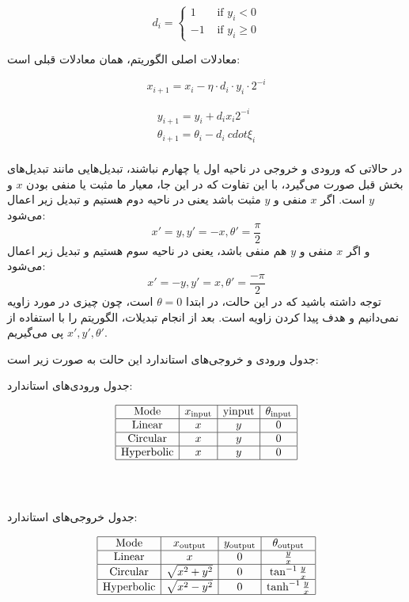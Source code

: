 \documentclass[12pt,titlepage,a4page , tikz , multi,table , svgnames,xcdraw]{article}
\begin{document}
$$d_{i}=\left\{\begin{array}{ll}
1 & \text { if } y_{i}<0 \\
-1 & \text { if } y_{i} \geq 0
\end{array}\right.$$

\newpage
معادلات اصلی الگوریتم، همان معادلات قبلی است:

$$x_{i+1}=x_{i}- \eta \cdot d_{i} \cdot y_{i} \cdot 2^{-i}$$

$$\begin{array}{c}
y_{i+1}=y_{i}+d_{i} x_{i} 2^{-i} \\
\theta_{i+1}=\theta_{i}-d_{i} \ cdot \xi_i \\
\end{array}$$


در حالاتی که ورودی و خروجی در ناحیه اول یا چهارم نباشند، تبدیل‌هایی مانند تبدیل‌های بخش قبل صورت می‌گیرد، با این تفاوت که در این جا، معیار ما مثبت یا منفی بودن $x$ و $y$ است. اگر $x$ منفی و $y$ مثبت باشد یعنی در ناحیه دوم هستیم و تبدیل زیر اعمال می‌شود:
$$x' = y , y' = -x , \theta' =  \frac{\pi}{2}$$
و اگر $x$ منفی و $y$ هم منفی باشد، یعنی در ناحیه سوم هستیم و تبدیل زیر اعمال می‌شود:
$$x' = -y , y' = x , \theta' =  \frac{-\pi}{2}$$
توجه داشته باشید که در این حالت، در ابتدا $\theta =0$ است، چون چیزی در مورد زاویه نمی‌دانیم و هدف پیدا کردن زاویه است. بعد از انجام تبدیلات، الگوریتم را با استفاده از $x' , y' , \theta'$ پی می‌گیریم.


جدول ورودی و خروجی‌های استاندارد این حالت به صورت زیر است:


\begin{center}
جدول ورودی‌های استاندارد:
\end{center}
$$\begin{array}{|c|c|c|c|}
\hline \text { Mode } & x_{\text {input}} & \text {yinput} & \theta_{\text {input}} \\
\hline \text {Linear} & x & y & 0 \\
\hline \text {Circular} & x & y & 0 \\
\hline \text {Hyperbolic} & x & y & 0 \\
\hline
\end{array}$$
\\
\\
\begin{center}
جدول خروجی‌های استاندارد:
\end{center}

$$\begin{array}{|c|c|c|c|}
\hline \text { Mode } & x_{\text {output}} & y_\text{output} & \theta_{\text {output}} \\
\hline \text {Linear} & x & 0 & \frac{y}{x} \\
\hline \text {Circular} & \sqrt{x^{2}+y^{2}} & 0 & \tan ^{-1} \frac{y}{x} \\
\hline \text {Hyperbolic} & \sqrt{x^{2}-y^{2}} & 0 & \tanh ^{-1} \frac{y}{x} \\
\hline
\end{array}$$
\end{document}

